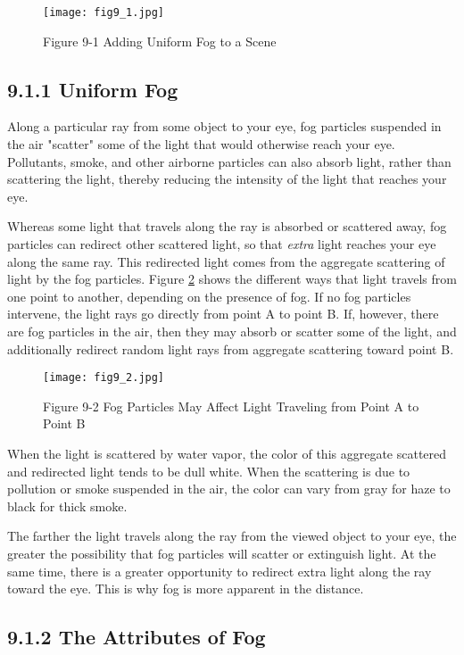 \documentclass[../main.tex]{subfiles}
\begin{document}
\begin{figure}
    \centering
    \texttt{[image: fig9\_1.jpg]}
    \caption{Figure 9-1 Adding Uniform Fog to a Scene}
    \label{fig:9-1}
\end{figure}

\subsection{9.1.1 Uniform Fog}

Along a particular ray from some object to your eye, fog particles suspended in the air "scatter" some of the light that would otherwise reach your eye. Pollutants, smoke, and other airborne particles can also absorb light, rather than scattering the light, thereby reducing the intensity of the light that reaches your eye.

Whereas some light that travels along the ray is absorbed or scattered away, fog particles can redirect other scattered light, so that \textit{extra} light reaches your eye along the same ray. This redirected light comes from the aggregate scattering of light by the fog particles. Figure \ref{fig:9-2} shows the different ways that light travels from one point to another, depending on the presence of fog. If no fog particles intervene, the light rays go directly from point A to point B. If, however, there are fog particles in the air, then they may absorb or scatter some of the light, and additionally redirect random light rays from aggregate scattering toward point B.

\begin{figure}
    \centering
    \texttt{[image: fig9\_2.jpg]}
    \caption{Figure 9-2 Fog Particles May Affect Light Traveling from Point A to Point B}
    \label{fig:9-2}
\end{figure}

When the light is scattered by water vapor, the color of this aggregate scattered and redirected light tends to be dull white. When the scattering is due to pollution or smoke suspended in the air, the color can vary from gray for haze to black for thick smoke.

The farther the light travels along the ray from the viewed object to your eye, the greater the possibility that fog particles will scatter or extinguish light. At the same time, there is a greater opportunity to redirect extra light along the ray toward the eye. This is why fog is more apparent in the distance.

\subsection{9.1.2 The Attributes of Fog}
\end{document}
